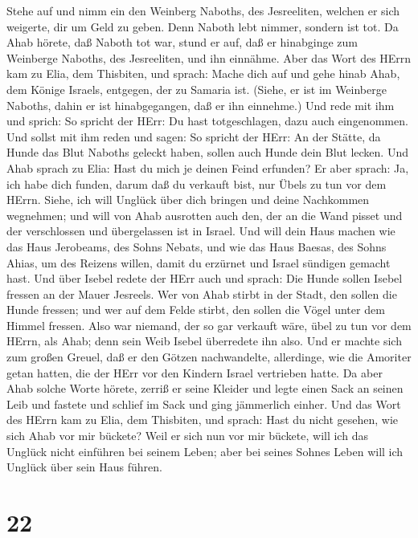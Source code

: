 Stehe auf und nimm ein den Weinberg Naboths, des Jesreeliten, welchen er
sich weigerte, dir um Geld zu geben. Denn Naboth lebt nimmer, sondern
ist tot.  Da Ahab hörete, daß Naboth tot war, stund er auf,
daß er hinabginge zum Weinberge Naboths, des Jesreeliten, und ihn
einnähme.  Aber das Wort des HErrn kam zu Elia, dem
Thisbiten, und sprach:  Mache dich auf und gehe hinab Ahab,
dem Könige Israels, entgegen, der zu Samaria ist. (Siehe, er ist im
Weinberge Naboths, dahin er ist hinabgegangen, daß er ihn einnehme.)
 Und rede mit ihm und sprich: So spricht der HErr: Du hast
totgeschlagen, dazu auch eingenommen. Und sollst mit ihm reden und
sagen: So spricht der HErr: An der Stätte, da Hunde das Blut Naboths
geleckt haben, sollen auch Hunde dein Blut lecken.  Und
Ahab sprach zu Elia: Hast du mich je deinen Feind erfunden? Er aber
sprach: Ja, ich habe dich funden, darum daß du verkauft bist, nur Übels
zu tun vor dem HErrn.  Siehe, ich will Unglück über dich
bringen und deine Nachkommen wegnehmen; und will von Ahab ausrotten auch
den, der an die Wand pisset und der verschlossen und übergelassen ist in
Israel.  Und will dein Haus machen wie das Haus Jerobeams,
des Sohns Nebats, und wie das Haus Baesas, des Sohns Ahias, um des
Reizens willen, damit du erzürnet und Israel sündigen gemacht hast.
 Und über Isebel redete der HErr auch und sprach: Die Hunde
sollen Isebel fressen an der Mauer Jesreels.  Wer von Ahab
stirbt in der Stadt, den sollen die Hunde fressen; und wer auf dem Felde
stirbt, den sollen die Vögel unter dem Himmel fressen. 
Also war niemand, der so gar verkauft wäre, übel zu tun vor dem HErrn,
als Ahab; denn sein Weib Isebel überredete ihn also.  Und
er machte sich zum großen Greuel, daß er den Götzen nachwandelte,
allerdinge, wie die Amoriter getan hatten, die der HErr vor den Kindern
Israel vertrieben hatte.  Da aber Ahab solche Worte hörete,
zerriß er seine Kleider und legte einen Sack an seinen Leib und fastete
und schlief im Sack und ging jämmerlich einher.  Und das
Wort des HErrn kam zu Elia, dem Thisbiten, und sprach: 
Hast du nicht gesehen, wie sich Ahab vor mir bückete? Weil er sich nun
vor mir bückete, will ich das Unglück nicht einführen bei seinem Leben;
aber bei seines Sohnes Leben will ich Unglück über sein Haus führen.

\hypertarget{section-21}{%
\section{22}\label{section-21}}

